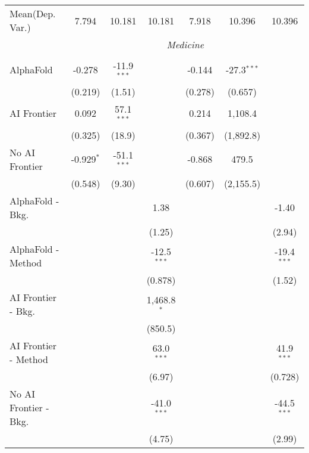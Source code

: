 \begin{tabular}{lcccccc}
Mean(Dep. Var.) & 7.794 & 10.181 & 10.181 & 7.918 & 10.396 & 10.396 \\
 & \multicolumn{6}{c}{\textit{Medicine}} \\ \\
   AlphaFold               & -0.278       & -11.9$^{***}$ &               & -0.144  & -27.3$^{***}$ &   \\   
                           & (0.219)      & (1.51)        &               & (0.278) & (0.657)       &   \\   
   AI Frontier             & 0.092        & 57.1$^{***}$  &               & 0.214   & 1,108.4       &   \\   
                           & (0.325)      & (18.9)        &               & (0.367) & (1,892.8)     &   \\   
   No AI Frontier          & -0.929$^{*}$ & -51.1$^{***}$ &               & -0.868  & 479.5         &   \\   
                           & (0.548)      & (9.30)        &               & (0.607) & (2,155.5)     &   \\   
   AlphaFold - Bkg.        &              &               & 1.38          &         &               & -1.40\\   
                           &              &               & (1.25)        &         &               & (2.94)\\   
   AlphaFold - Method      &              &               & -12.5$^{***}$ &         &               & -19.4$^{***}$\\   
                           &              &               & (0.878)       &         &               & (1.52)\\   
   AI Frontier - Bkg.      &              &               & 1,468.8$^{*}$ &         &               &   \\   
                           &              &               & (850.5)       &         &               &   \\   
   AI Frontier - Method    &              &               & 63.0$^{***}$  &         &               & 41.9$^{***}$\\   
                           &              &               & (6.97)        &         &               & (0.728)\\   
   No AI Frontier - Bkg.   &              &               & -41.0$^{***}$ &         &               & -44.5$^{***}$\\   
                           &              &               & (4.75)        &         &               & (2.99)\\   

\end{tabular}
